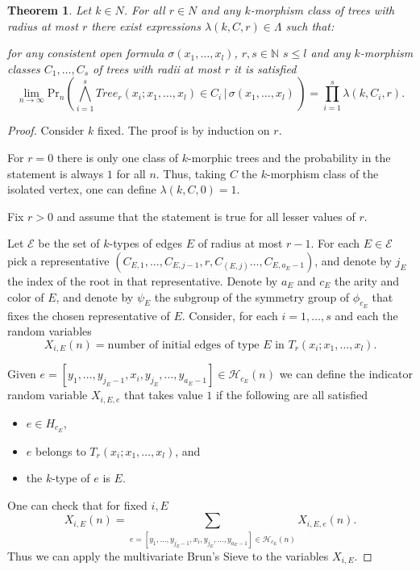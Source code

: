\documentclass[11pt,notitlepage,a4paper]{article}
\newtheorem{theorem}{Theorem}[section]
\theoremstyle{definition}
\newcommand{\N}{\mathbb{N}}
\newcommand{\Ln}{\lim\limits_{n\to \infty}}
\begin{document}
\begin{theorem} \label{thm:probtrees}
	Let $k\in N$. 
    For all $r\in N$ and any $k$-morphism class of trees with radius
	at most $r$ there exist expressions $\lambda(k,C,r)\in \Lambda$ 
	such that:
	\item for any consistent open formula $\sigma(x_1,\dots, x_l)$, $r,s\in \N$ $s\leq l$ and any $k$-morphism classes $C_1, 
	\dots, C_s$ of trees with radii
	at most $r$ it is satisfied
	\[ \Ln \mathrm{Pr}_n(\bigwedge_{i=1}^s Tree_r(x_i; x_1, \dots, x_l)\in C_i \, | 
	\, \sigma(x_1,\dots, x_l) \,)= \prod_ {i=1}^s \lambda(k,C_i,r).\]	
\end{theorem}
\begin{proof}
Consider $k$ fixed.
The proof is by induction on $r$. 

	\item For $r=0$ there is only one class
	of $k$-morphic trees and the probability in 
	the statement is always $1$ for all $n$.
	Thus, taking $C$ the $k$-morphism class of the isolated
	vertex, one can define $\lambda(k,C,0)=1$. 
	\item Fix $r>0$ and assume that the statement
	is true for all lesser values of $r$. \par
	Let $\mathcal{E}$ be the set of $k$-types of edges $E$ of
	radius at most $r-1$. For each $E\in \mathcal{E}$
	pick a representative
	$( C_{E,1}, \dots, C_{E,j-1}, r, C_{(E,j)}\dots, C_{E,a_E-1})$, 
	and denote by $j_E$ the index of the root in that representative. 
	Denote by $a_E$ and $c_E$ the arity and color of $E$, and 
	denote by $\psi_E$ the subgroup of the symmetry group of $\phi_{c_E}$ 
	that fixes the chosen representative of $E$.
	Consider, for each $i=1,\dots, s$ and each the random variables 
	\[X_{i,E}(n)= \text{number of initial edges of type }E \text{ in } 
	T_r(x_i;x_1, \dots, x_l). \]
	
	Given $e=[y_1,\dots,y_{j_E-1},x_i, y_{j_E},\dots ,y_{a_E-1}]\in \mathcal{H}_{c_E}(n)$ we can define the indicator 
	random variable $X_{i,E,e}$ that takes value $1$ if the following are 
	all satisfied
	\begin{itemize}
		\item $e\in H_{c_E}$,
		\item $e$ belongs to $T_r(x_i;x_1, \dots, x_l)$, and
		\item the $k$-type of $e$ is $E$. 	
	\end{itemize} 
	One can check that for fixed $i, E$
	\[X_{i,E}(n)= \sum_{e=[y_1,\dots,y_{j_E-1},x_i,y_{j_E},
	\dots ,y_{a_E-1}]\in \mathcal{H}_{c_E}(n)} X_{i,E,e}(n).\]
	Thus we can apply the multivariate Brun's Sieve to the variables 
	$X_{i, E}$.\par
	

\end{proof}
\end{document}
